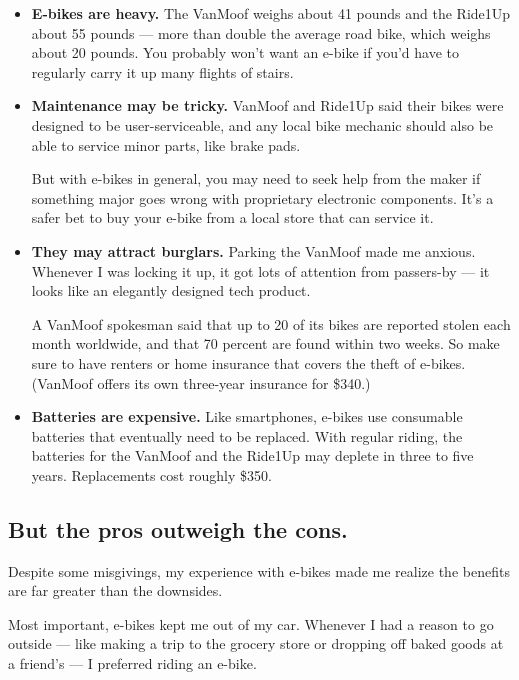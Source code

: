 \begin{itemize}
\item
  \textbf{E-bikes are heavy.} The VanMoof weighs about 41 pounds and the
  Ride1Up about 55 pounds --- more than double the average road bike,
  which weighs about 20 pounds. You probably won't want an e-bike if
  you'd have to regularly carry it up many flights of stairs.
\item
  \textbf{Maintenance may be tricky.} VanMoof and Ride1Up said their
  bikes were designed to be user-serviceable, and any local bike
  mechanic should also be able to service minor parts, like brake pads.

  But with e-bikes in general, you may need to seek help from the maker
  if something major goes wrong with proprietary electronic components.
  It's a safer bet to buy your e-bike from a local store that can
  service it.
\item
  \textbf{They may attract burglars.} Parking the VanMoof made me
  anxious. Whenever I was locking it up, it got lots of attention from
  passers-by --- it looks like an elegantly designed tech product.

  A VanMoof spokesman said that up to 20 of its bikes are reported
  stolen each month worldwide, and that 70 percent are found within two
  weeks. So make sure to have renters or home insurance that covers the
  theft of e-bikes. (VanMoof offers its own three-year insurance for
  \$340.)
\item
  \textbf{Batteries are expensive.} Like smartphones, e-bikes use
  consumable batteries that eventually need to be replaced. With regular
  riding, the batteries for the VanMoof and the Ride1Up may deplete in
  three to five years. Replacements cost roughly \$350.
\end{itemize}

\hypertarget{but-the-pros-outweigh-the-cons}{%
\subsection{But the pros outweigh the
cons.}\label{but-the-pros-outweigh-the-cons}}

Despite some misgivings, my experience with e-bikes made me realize the
benefits are far greater than the downsides.

Most important, e-bikes kept me out of my car. Whenever I had a reason
to go outside --- like making a trip to the grocery store or dropping
off baked goods at a friend's --- I preferred riding an e-bike.

